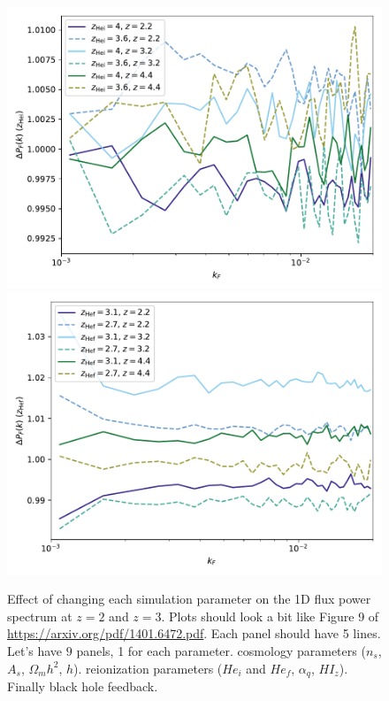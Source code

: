\documentclass[a4paper,11pt]{article}
\begin{document}
\begin{figure}
    \centering
	\includegraphics[width=0.48\columnwidth]{figures/single_param_herei.pdf}
    \includegraphics[width=0.48\columnwidth]{figures/single_param_heref.pdf}

    \caption{Effect of changing each simulation parameter on the 1D flux power spectrum at $z=2$ and $z=3$. Plots should look a bit like Figure 9 of \url{https://arxiv.org/pdf/1401.6472.pdf}. Each panel should have 5 lines. Let's have $9$ panels, 1 for each parameter. cosmology parameters ($n_s$, $A_s$, $\Omega_m h^2$, $h$). reionization parameters ($He_i$ and $He_f$, $\alpha_q$, $HI_z$). Finally black hole feedback. }
    \label{fig:zhefluxpower}
\end{figure}
\end{document}
